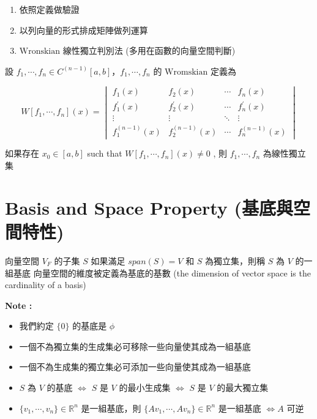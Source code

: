\documentclass[
]{book}
\providecommand{\tightlist}{%
  \setlength{\itemsep}{0pt}\setlength{\parskip}{0pt}}
\begin{document}
\begin{enumerate}
\def\labelenumi{\arabic{enumi}.}
\tightlist
\item
  依照定義做驗證
\item
  以列向量的形式排成矩陣做列運算
\item
  \(\mbox{Wronskian}\) 線性獨立判別法 (多用在函數的向量空間判斷)
\end{enumerate}

設 \(f_1, \cdots, f_n \in C^{(n-1)}[a,b]\)，\(f_1, \cdots, f_n\) 的 \(\mbox{Wromskian}\) 定義為

\[
W[f_1, \cdots, f_n](x) = \begin{vmatrix}
 f_1(x) & f_2(x) & \cdots & f_n(x)\\
 f_1^{\prime}(x) &  f_2^{\prime}(x) & \cdots &  f_n^{\prime}(x)\\
 \vdots & \vdots & \ddots & \vdots\\
  f_1^{(n-1)}(x) &  f_2^{(n-1)}(x) & \cdots &  f_n^{(n-1)}(x)
\end{vmatrix}
\]

如果存在 \(x_0 \in [a, b]\) such that \(W[f_1, \cdots, f_n](x) \neq 0\) , 則 \(f_1,\cdots,f_n\) 為線性獨立集

\hypertarget{basis-and-space-property-ux57faux5e95ux8207ux7a7aux9593ux7279ux6027}{%
\section{Basis and Space Property (基底與空間特性)}\label{basis-and-space-property-ux57faux5e95ux8207ux7a7aux9593ux7279ux6027}}

向量空間 \(V_F\) 的子集 \(S\) 如果滿足 \(span(S) = V\) 和 \(S\) 為獨立集，則稱 \(S\) 為 \(V\) 的一組基底
向量空間的維度被定義為基底的基數 (the dimension of vector space is the cardinality of a basis)

\textbf{Note :}

\begin{itemize}
\tightlist
\item
  我們約定 \(\{0\}\) 的基底是 \(\phi\)
\item
  一個不為獨立集的生成集必可移除一些向量使其成為一組基底
\item
  一個不為生成集的獨立集必可添加一些向量使其成為一組基底
\item
  \(S\) 為 \(V\) 的基底 \(\iff\) \(S\) 是 \(V\) 的最小生成集 \(\iff\) \(S\) 是 \(V\) 的最大獨立集
\item
  \(\{v_1,\cdots,v_n\} \in \mathbb{R}^n\) 是一組基底，則 \(\{Av_1,\cdots,Av_n\} \in \mathbb{R}^n\) 是一組基底 \(\iff A\) 可逆
\end{itemize}
\end{document}
